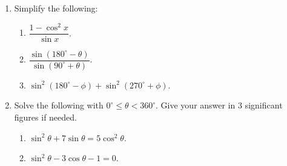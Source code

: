 \documentclass[11pt]{article}
\begin{document}
\begin{enumerate}
            \hrulefill
            
            \hrulefill
            
            \hrulefill
            
            \hrulefill
            
            \hrulefill
            
            \hrulefill

        \pagebreak
        \item Simplify the following:\begin{enumerate}
            \item $\dfrac{1-\cos^2{x}}{\sin{x}}$.
            \item $\dfrac{\sin(180^\circ-\theta)}{\sin(90^\circ+\theta)}$.
            \item $\sin^2(180^\circ-\phi)+\sin^2(270^\circ+\phi)$.
        \end{enumerate}

        \hrulefill

            \hrulefill

            \hrulefill
            
            \hrulefill
            
            \hrulefill
            
            \hrulefill
            
            \hrulefill
            
            \hrulefill
            
            \hrulefill
            
            \hrulefill

        \item Solve the following with $0^\circ\leq \theta< 360^\circ$. Give your answer in 3 significant figures if needed.\begin{enumerate}
            \item $\sin^2{\theta}+7\sin{\theta}=5\cos^2{\theta}$.
            \item $\sin^2{\theta}-3\cos{\theta}-1=0$.
        \end{enumerate}

        \hrulefill

        \hrulefill
            
        \hrulefill
        
        \hrulefill
        
        \hrulefill
        
        \hrulefill
        

\end{enumerate}
\end{document}
